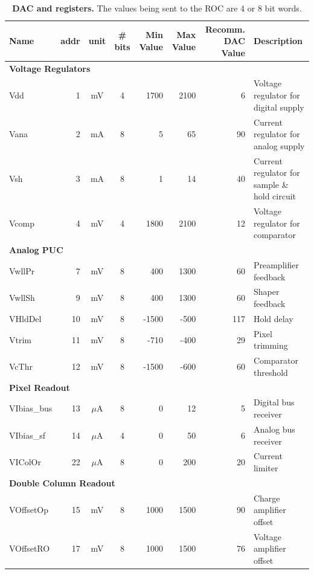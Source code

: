 \begin{table}[h]
    \begin{center}
	\caption{\textbf{DAC and registers.} The values being sent to the ROC are 4 or 8 bit words.}
	\label{tab:DecBinHex}

	\bigskip

	{\scriptsize
	\begin{tabular}{lrccrrrl}
	\toprule
	Name & addr & unit & \# bits & \multicolumn{1}{p{0.8cm}}{Min Value} & \multicolumn{1}{p{0.8cm}}{Max Value} & \multicolumn{1}{p{1.2cm}}{Recomm. DAC Value} & Description \\ 
	\midrule
	\multicolumn{ 8}{l}{\textbf{Voltage Regulators}} \\ 
	Vdd         &  1 &   mV    & 4 & 1700 & 2100 & 6 & Voltage regulator for digital supply \\ 
	Vana        &  2 &   mA    & 8 & 5 & 65 & 90 & Current regulator for analog supply \\ 
	Vsh         &  3 &   mA    & 8 & 1 & 14 & 40 & Current regulator for sample \& hold circuit \\ 
	Vcomp       &  4 &   mV    & 4 & 1800 & 2100 & 12 & Voltage regulator for comparator \\ 
	\midrule
	\multicolumn{ 8}{l}{\textbf{Analog PUC}} \\ 
	VwllPr      &  7 &   mV    & 8 & 400 & 1300 & 60 & Preamplifier feedback  \\ 
	VwllSh      &  9 &   mV    & 8 & 400 & 1300 & 60 & Shaper feedback \\ 
	VHldDel     & 10 &   mV    & 8 & -1500 & -500 & 117 & Hold delay \\ 
	Vtrim       & 11 &   mV    & 8 & -710 & -400 & 29 & Pixel trimming \\ 
	VcThr       & 12 &   mV    & 8 & -1500 & -600 & 60 & Comparator threshold \\ 
	\midrule
	\multicolumn{ 8}{l}{\textbf{Pixel Readout}} \\ 
	VIbias\_bus & 13 & $\mu$A  & 8 & 0 & 12 & 5 & Digital bus receiver \\ 
	VIbias\_sf  & 14 & $\mu$A  & 4 & 0 & 50 & 6 & Analog bus receiver \\ 
	VIColOr     & 22 & $\mu$A  & 8 & 0 & 200 & 20 & Current limiter \\ 
	\midrule
	\multicolumn{ 8}{l}{\textbf{Double Column Readout}} \\ 
	VOffsetOp   & 15 &   mV    & 8 & 1000 & 1500 & 90 & Charge amplifier offset \\ 
	VOffsetRO   & 17 &   mV    & 8 & 1000 & 1500 & 76 & Voltage amplifier offset \\ 

\end{tabular}}
\end{center}
\end{table}
